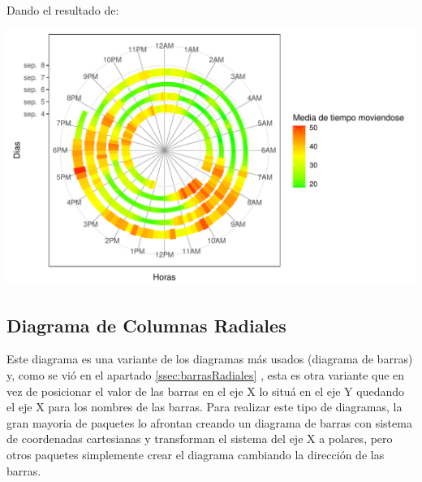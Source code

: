 \documentclass{article}\usepackage[]{graphicx}\usepackage[]{color}
\makeatletter
\def\maxwidth{ %
  \ifdim\Gin@nat@width>\linewidth
    \linewidth
  \else
    \Gin@nat@width
  \fi
}
\newenvironment{knitrout}{}{} %
\makeatother
\begin{document}
\clearpage
Dando el resultado de:~\\
\begin{knitrout}
\color{fgcolor}

{\centering \includegraphics[width=\maxwidth]{figure/plot_title-1} 

}



\end{knitrout}
\clearpage
\subsection{Diagrama de Columnas Radiales}\label{ssec:columnasRadiales}
Este diagrama es una variante de los diagramas m\'as usados (diagrama de barras) y, como se vi\'o en el apartado \autoref{ssec:barrasRadiales}
, esta es otra variante que en vez de posicionar el valor de las barras en el eje X lo situ\'a en el eje Y quedando el eje X para los nombres de las barras.
Para realizar este tipo de diagramas, la gran mayoria de paquetes lo afrontan creando un diagrama de barras con sistema de coordenadas cartesianas y transforman el sistema del eje X a polares, pero otros paquetes simplemente crear el diagrama cambiando la direcci\'on de las barras.
\end{document}
